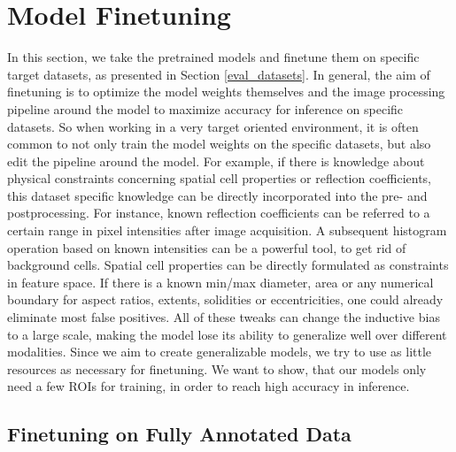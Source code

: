 \section{Model Finetuning}
\label{Finetuning}

In this section, we take the pretrained models and finetune them on specific target datasets, as presented in Section \ref{eval_datasets}. In general, the aim of finetuning is to optimize the model weights themselves and the image processing pipeline around the model to maximize accuracy for inference on specific datasets. So when working in a very target oriented environment, it is often common to not only train the model weights on the specific datasets, but also edit the pipeline around the model. For example, if there is knowledge about physical constraints concerning spatial cell properties or reflection coefficients, this dataset specific knowledge can be directly incorporated into the pre- and postprocessing. For instance, known reflection coefficients can be referred to a certain range in pixel intensities after image acquisition. A subsequent histogram operation based on known intensities can be a powerful tool, to get rid of background cells. Spatial cell properties can be directly formulated as constraints in feature space. If there is a known min/max diameter, area or any numerical boundary for aspect ratios, extents, solidities or eccentricities, one could already eliminate most false positives. All of these tweaks can change the inductive bias to a large scale, making the model lose its ability to generalize well over different modalities. Since we aim to create generalizable models, we try to use as little resources as necessary for finetuning. We want to show, that our models only need a few ROIs for training, in order to reach high accuracy in inference. 

\subsection{Finetuning on Fully Annotated Data}

